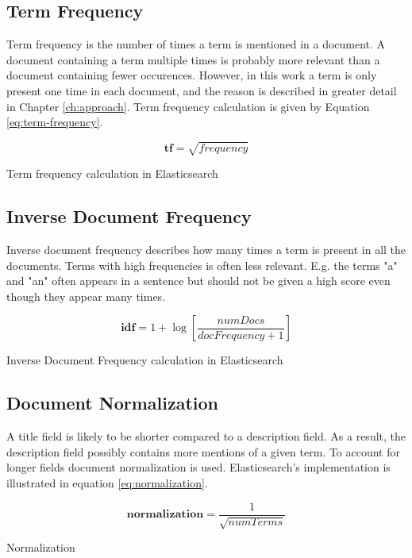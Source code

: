 \subsection{Term Frequency}
Term frequency is the number of times a term is mentioned in a document.
A document containing a term multiple times is probably more relevant than a document containing fewer occurences.
However, in this work a term is only present one time in each document, and the reason is described in greater detail in Chapter \ref{ch:approach}.
Term frequency calculation is given by Equation \ref{eq:term-frequency}.

\begin{cequation}[H]
	\begin{equation}
		\mathbf{tf} = \sqrt{frequency}
	\end{equation}
	\caption{Term frequency calculation in Elasticsearch}
  \label{eq:term-frequency}
\end{cequation}

\subsection{Inverse Document Frequency}
Inverse document frequency describes how many times a term is present in all the documents.
Terms with high frequencies is often less relevant.
E.g. the terms "a" and "an" often appears in a sentence but should not be given a high score even though they appear many times.

\begin{cequation}[H]
	\begin{equation}
		\mathbf{idf} = 1 + \log{[\frac{numDocs}{docFrequency + 1}]}
	\end{equation}
	\caption{Inverse Document Frequency calculation in Elasticsearch}
  \label{eq:idf}
\end{cequation}

\subsection{Document Normalization}
A title field is likely to be shorter compared to a description field.
As a result, the description field possibly contains more mentions of a given term.
To account for longer fields document normalization is used.
Elasticsearch's implementation is illustrated in equation \ref{eq:normalization}.

\begin{cequation}[H]
	\begin{equation}
		\mathbf{normalization} = \frac{1}{\sqrt{numTerms}}
	\end{equation}
	\caption{Normalization}
  \label{eq:normalization}
\end{cequation}

